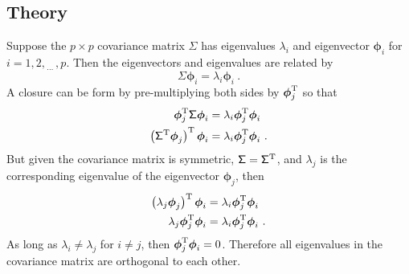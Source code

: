 \documentclass[12pt]{report}
\newcommand{\T}{^\textup{T}}
\newcommand{\dotdotdot}{_{\phantom{.}\cdots}}
\newcommand{\vectGreek}[1]{\boldsymbol{#1}}
\newcommand{\matr}[1]{\mathsf{#1}}
\begin{document}
\subsection{Theory}
Suppose the $p\times p$ covariance matrix $\matr{\Sigma}$ has eigenvalues $\lambda_i$ and eigenvector $\vectGreek{\phi}_i$ for $i=1,2,\dotdotdot,p$. Then the eigenvectors and eigenvalues are related by
\begin{equation}
\matr{\Sigma}\vectGreek{\phi}_i = \lambda_i\vectGreek{\phi}_i \ .
\label{eq:eigenvector_eigenvalue_forCovariance}
\end{equation}
A closure can be form by pre-multiplying both sides by $\vectGreek{\phi}_j\T$ so that
\begin{align*}
\vectGreek{\phi}_j\T \matr{\Sigma}\vectGreek{\phi}_i &= \lambda_i\vectGreek{\phi}_j\T\vectGreek{\phi}_i \\
\left(\matr{\Sigma}\T \vectGreek{\phi}_j \right)\T\vectGreek{\phi}_i &= \lambda_i\vectGreek{\phi}_j\T\vectGreek{\phi}_i \ .
\end{align*}
But given the covariance matrix is symmetric, $\matr{\Sigma}=\matr{\Sigma}\T$, and $\lambda_j$ is the corresponding eigenvalue of the eigenvector $\vectGreek{\phi}_j$, then
\begin{align*}
\left(\lambda_j\vectGreek{\phi}_j \right)\T\vectGreek{\phi}_i &= \lambda_i\vectGreek{\phi}_j\T\vectGreek{\phi}_i \\
\lambda_j\vectGreek{\phi}_j\T\vectGreek{\phi}_i &= \lambda_i\vectGreek{\phi}_j\T\vectGreek{\phi}_i \ .
\end{align*}
As long as $\lambda_i\neq\lambda_j$ for $i\neq j$, then $\vectGreek{\phi}_j\T\vectGreek{\phi}_i=0$. Therefore all eigenvalues in the covariance matrix are orthogonal to each other.
\end{document}
